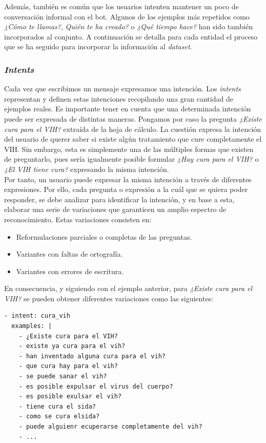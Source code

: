Además, también es común que los usuarios intenten mantener un poco de conversación informal con el bot. Algunos de los ejemplos más repetidos como \textit{¿Cómo te llamas?}, \textit{Quién te ha creado?} o \textit{¿Qué tiempo hace?} han sido también incorporados al conjunto. A continuación se detalla para cada entidad el proceso que se ha seguido para incorporar la información al \textit{dataset}.\\

\subsubsection{\textit{Intents}}
Cada vez que escribimos un mensaje expresamos una intención. Los \textit{intents} representan y definen estas intenciones recopilando una gran cantidad de ejemplos reales. Es importante tener en cuenta que una determinada intención puede ser expresada de distintas maneras. Pongamos por caso la pregunta  \textit{¿Existe cura para el VIH?} extraída de la hoja de cálculo. La cuestión expresa la intención del usuario de querer saber si existe algún tratamiento que cure completamente el VIH. Sin embargo, esta es simplemente una  de las múltiples formas que existen de preguntarlo, pues sería igualmente posible formular \textit{¿Hay cura para el VIH?} o \textit{¿El VIH tiene cura?} expresando la misma intención.\\

Por tanto, un usuario puede expresar la misma intención a través de diferentes expresiones. Por ello, cada pregunta o expresión a la cuál que se quiera poder responder, se debe analizar para identificar la intención, y en base a esta, elaborar una serie de variaciones que garanticen un amplio espectro de reconocimiento.
Estas variaciones consisten en:

\begin{itemize}
	\item Reformulaciones parciales o completas de las preguntas.
	\item Variantes con faltas de ortografía.
	\item Variantes con errores de escritura.
\end{itemize}

En consecuencia, y siguiendo con el ejemplo anterior, para \textit{¿Existe cura para el VIH?} se pueden obtener diferentes variaciones como las siguientes:

\begin{verbatim}
- intent: cura_vih
  examples: |
    - ¿Existe cura para el VIH?
    - existe ya cura para el vih?
    - han inventado alguna cura para el vih?
    - que cura hay para el vih?
    - se puede sanar el vih?
    - es posible expulsar el virus del cuerpo?
    - es posible exulsar el vih?
    - tiene cura el sida?
    - como se cura elsida?
    - puede alguienr ecuperarse completamente del vih?
    - ...
\end{verbatim}

